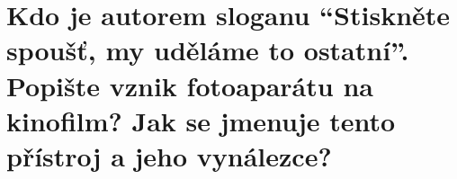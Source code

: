 \section{Kdo je autorem sloganu \enquote{Stiskněte spoušť, my uděláme to ostatní}. Popište vznik fotoaparátu na 
kinofilm? Jak se jmenuje tento přístroj a jeho vynálezce?}